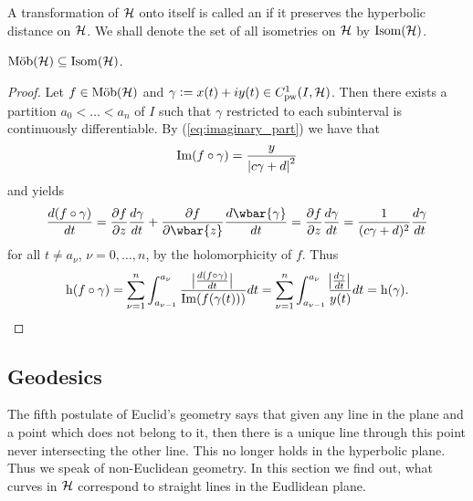 \begin{definition}[Isometries]
	A transformation of $\mathcal{H}$ onto itself is called an  if it preserves the hyperbolic distance on $\mathcal{H}$. We shall denote the set of all isometries on $\mathcal{H}$ by $\mathrm{Isom}(\mathcal{H})$.
\end{definition}

\begin{proposition}
	$\mathrm{M\ddot{o}b}(\mathcal{H}) \subseteq \mathrm{Isom}(\mathcal{H})$.
	\label{prop:inclusion}
\end{proposition}

\begin{proof}
	Let $f \in \mathrm{M\ddot{o}b}(\mathcal{H})$ and $\gamma := x(t) + iy(t) \in C^1_{\mathrm{pw}}(I,\mathcal{H})$. Then there exists a partition $a_0 < \dots < a_n$ of $I$ such that $\gamma$ restricted to each subinterval is continuously differentiable. By (\ref{eq:imaginary_part}) we have that
	\begin{equation*}
		\Im(f \circ \gamma) = \frac{y}{\abs[0]{c\gamma + d}^2}
	\end{equation*}
	\noindent and \cite[25]{lieb:funktionentheorie:2003} yields
	\begin{equation*}
		\frac{d(f \circ \gamma)}{dt} = \frac{\partial f}{\partial z}\frac{d\gamma}{dt} + \frac{\partial f}{\partial \wbar{z}}\frac{d\wbar{\gamma}}{dt} = \frac{\partial f}{\partial z}\frac{d\gamma}{dt} = \frac{1}{(c\gamma + d)^2}\frac{d\gamma}{dt}
	\end{equation*}
	\noindent for all $t \neq a_\nu$, $\nu = 0,\dots,n$, by the holomorphicity of $f$. Thus
	\begin{equation*}
		\h(f \circ \gamma) =  \sum_{\nu = 1}^n \int_{a_{\nu - 1}}^{a_{\nu}} \frac{\abs[1]{\frac{d(f \circ \gamma)}{dt}}}{\Im(f(\gamma(t)))}dt = \sum_{\nu = 1}^n\int_{a_{\nu - 1}}^{a_\nu} \frac{\abs[1]{\frac{d\gamma}{dt}}}{y(t)}dt = \h(\gamma).
	\end{equation*}
\end{proof}

\subsection{Geodesics}
The fifth postulate of Euclid's geometry says that given any line in the plane and a point which does not belong to it, then there is a unique line through this point never intersecting the other line. This no longer holds in the hyperbolic plane. Thus we speak of non-Euclidean geometry. In this section we find out, what curves in $\mathcal{H}$ correspond to straight lines in the Eudlidean plane.

